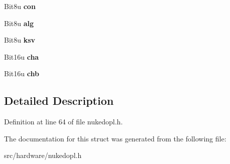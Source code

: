 \begin{DoxyCompactItemize}
\item 
\hypertarget{structopl3__channel_a02107cc9e88cfec2ec02e2eec53b7d6d}{Bit8u {\bfseries con}}\label{structopl3__channel_a02107cc9e88cfec2ec02e2eec53b7d6d}

\item 
\hypertarget{structopl3__channel_a12e650c38f5460c3359cce2cd0a5243e}{Bit8u {\bfseries alg}}\label{structopl3__channel_a12e650c38f5460c3359cce2cd0a5243e}

\item 
\hypertarget{structopl3__channel_a95ac142c912e1319f7c3d82d36161e91}{Bit8u {\bfseries ksv}}\label{structopl3__channel_a95ac142c912e1319f7c3d82d36161e91}

\item 
\hypertarget{structopl3__channel_a0b5743c5d7713e7c12c5d269d897ca3d}{Bit16u {\bfseries cha}}\label{structopl3__channel_a0b5743c5d7713e7c12c5d269d897ca3d}

\item 
\hypertarget{structopl3__channel_afe09c6d6a1791d8471fd1828b0490014}{Bit16u {\bfseries chb}}\label{structopl3__channel_afe09c6d6a1791d8471fd1828b0490014}

\end{DoxyCompactItemize}


\subsection{Detailed Description}


Definition at line 64 of file nukedopl.\-h.



The documentation for this struct was generated from the following file\-:\begin{DoxyCompactItemize}
\item 
src/hardware/nukedopl.\-h\end{DoxyCompactItemize}
